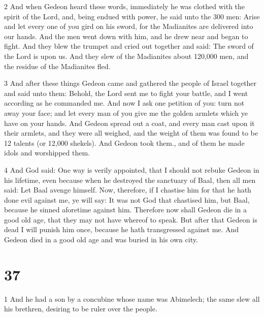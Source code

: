 \par 2 And when Gedeon heard these words, immediately he was clothed with the spirit of the Lord, and, being endued with power, he said unto the 300 men: Arise and let every one of you gird on his sword, for the Madianites are delivered into our hands. And the men went down with him, and he drew near and began to fight. And they blew the trumpet and cried out together and said: The sword of the Lord is upon us. And they slew of the Madianites about 120,000 men, and the residue of the Madianites fled.

\par 3 And after these things Gedeon came and gathered the people of Israel together and said unto them: Behold, the Lord sent me to fight your battle, and I went according as he commanded me. And now I ask one petition of you: turn not away your face; and let every man of you give me the golden armlets which ye have on your hands. And Gedeon spread out a coat, and every man cast upon it their armlets, and they were all weighed, and the weight of them was found to be 12 talents (or 12,000 shekels). And Gedeon took them., and of them he made idols and worshipped them. 

\par 4 And God said: One way is verily appointed, that I should not rebuke Gedeon in his lifetime, even because when he destroyed the sanctuary of Baal, then all men said: Let Baal avenge himself. Now, therefore, if I chastise him for that he hath done evil against me, ye will say: It was not God that chastised him, but Baal, because he sinned aforetime against him. Therefore now shall Gedeon die in a good old age, that they may not have whereof to speak. But after that Gedeon is dead I will punish him once, because he hath transgressed against me. And Gedeon died in a good old age and was buried in his own city.



\chapter{37}

\par 1 And he had a son by a concubine whose name was Abimelech; the same slew all his brethren, desiring to be ruler over the people.

\par [A leaf gone.]

